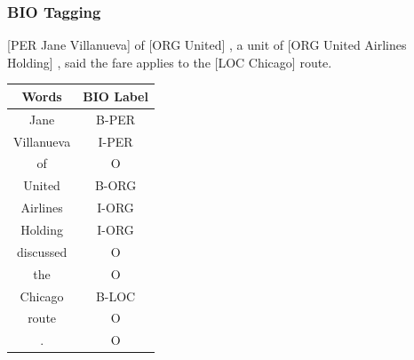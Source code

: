 \documentclass[13.5pt,aspecratio=169]{beamer}
\begin{document}
    \begin{frame}
    \onehalfspacing
    
        \frametitle{BIO Tagging}	
        \color{blue}[PER Jane Villanueva] \color{black}of \color{blue}[ORG United]\color{black} , a unit of \color{blue}[ORG United Airlines Holding]\color{black} , said the fare applies to the \color{blue}[LOC Chicago]\color{black} route. 
    \begin{center}
    \renewcommand{\arraystretch}{0.83} %
        \begin{tabular}{ |c|c| } 
        \hline
        \large Words &  \large BIO Label\\ 
        \hline \small
        Jane & \small B-PER \\ \small
        Villanueva & \small I-PER \\ \small
        of & \small O \\ \small
        United & \small B-ORG \\ \small
        Airlines & I-ORG \\ \small
        Holding & I-ORG \\ \small
        discussed & O \\ \small
        the & \small O \\ \small
        Chicago & \small B-LOC \\ \small
        route & \small O \\ \small
        . & \small O \\ 
    \hline
    \end{tabular}
    \end{center}
    \end{frame}
\end{document}
